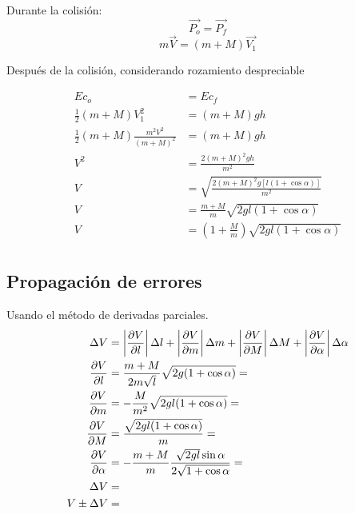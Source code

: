 \documentclass[a4paper]{article}
\begin{document}
Durante la colisión:
\[ \vec{P_o} = \vec{P_f} \]
\[ m \vec{V} = (m + M) \vec{V_1} \]

Después de la colisión, considerando rozamiento despreciable

\begin{align*}
    Ec_o &= Ec_f \\
    \frac{1}{2}(m+M)V_1^2 &= (m + M) g h \\
    \frac{1}{2} (m+M) \frac{m^2 V^2}{(m+M)^2} &= (m+M) gh \\
    V^2 &= \frac{2(m+M)^2 gh}{m^2} \\
    V &= \sqrt{\frac{2(m+M)^2 g [l(1+\cos\alpha)]}{m^2}} \\
    V &= \frac{m+M}{m} \sqrt{2gl(1+\cos \alpha)} \\
    V &= \left(1+ \frac{M}{m}\right) \sqrt{2gl(1+\cos \alpha)} \\
\end{align*}



\subsection{Propagación de errores} %
\label{sub:propagacion_de_errores}

Usando el método de derivadas parciales.
\begin{align*}
    \Delta V &= \left|\pdv{V}{l}\right| \Delta l + \left|\pdv{V}{m}\right| \Delta m + \left|\pdv{V}{M}\right| \Delta M + \left|\pdv{V}{\alpha}\right| \Delta \alpha \\
    \pdv{V}{l} &= \frac{m+M}{2 m \sqrt{l} } \sqrt{2g(1+\cos \alpha)} = \\
    \pdv{V}{m} &= -\frac{M}{m^2} \sqrt{2gl(1+\cos \alpha)} = \\
    \pdv{V}{M} &= \frac{\sqrt{2gl(1+\cos \alpha)}}{m} = \\
    \pdv{V}{\alpha} &= - \frac{m+M}{m} \frac{\sqrt{2gl} \sin\alpha}{2 \sqrt{1 + \cos\alpha}} = \\
    \Delta V &= \\
    V \pm \Delta V &= 
\end{align*}



\end{document}
